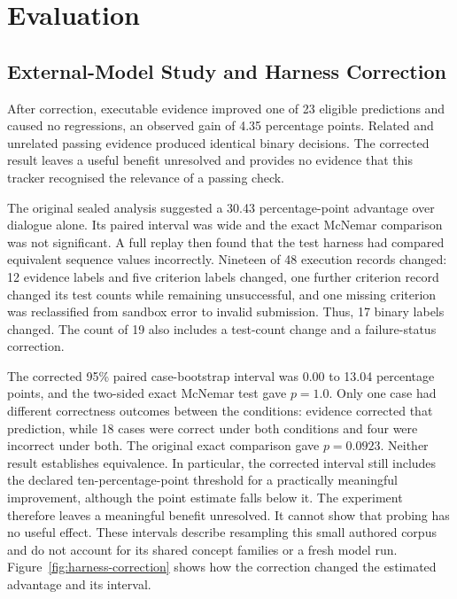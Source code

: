 \chapter{Evaluation}
\label{ch:evaluation}

\section{External-Model Study and Harness Correction}

After correction, executable evidence improved one of 23 eligible predictions and caused no regressions, an observed gain of
4.35 percentage points. Related and unrelated passing evidence produced identical binary decisions. The corrected result
leaves a useful benefit unresolved and provides no evidence that this tracker recognised the relevance of a passing check.

The original sealed analysis suggested a 30.43 percentage-point advantage over dialogue alone. Its paired interval was wide
and the exact McNemar comparison was not significant. A full replay then found that the test harness had compared equivalent
sequence values incorrectly. Nineteen of 48 execution records changed:
12 evidence labels and five criterion labels changed, one further criterion record changed its test counts while remaining
unsuccessful, and one missing criterion was reclassified from sandbox error to invalid submission. Thus, 17 binary labels
changed. The count of 19 also includes a test-count change and a failure-status correction.

The corrected 95\% paired case-bootstrap interval was 0.00 to 13.04 percentage points, and the two-sided exact McNemar
test gave $p=1.0$. Only one case had different correctness outcomes between the conditions: evidence corrected that prediction,
while 18 cases were correct under both conditions and four were incorrect under both. The original exact comparison gave
$p=0.0923$. Neither result establishes equivalence. In particular, the corrected interval still includes the declared
ten-percentage-point threshold for a practically meaningful improvement, although the point estimate falls below it.
The experiment therefore leaves a meaningful benefit unresolved. It cannot show that probing has no useful effect.
These intervals describe resampling this small authored corpus and do not account for its shared concept families or a fresh
model run. Figure~\ref{fig:harness-correction} shows how the correction changed the estimated advantage and its interval.


